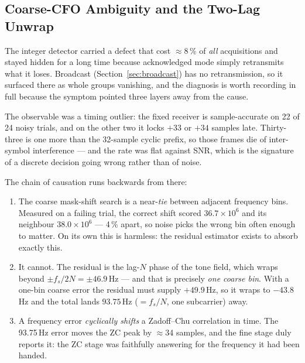 \subsection{Coarse-CFO Ambiguity and the Two-Lag Unwrap}
\label{sec:cfo_unwrap}

The integer detector carried a defect that cost $\approx$8\,\% of
\emph{all} acquisitions and stayed hidden for a long time because
acknowledged mode simply retransmits what it loses.  Broadcast
(Section~\ref{sec:broadcast}) has no retransmission, so it surfaced
there as whole groups vanishing, and the diagnosis is worth recording
in full because the symptom pointed three layers away from the cause.

The observable was a timing outlier: the fixed receiver is
sample-accurate on 22 of 24 noisy trials, and on the other two it locks
$+33$ or $+34$ samples late.  Thirty-three is one more than the
32-sample cyclic prefix, so those frames die of inter-symbol
interference --- and the rate was flat against SNR, which is the
signature of a discrete decision going wrong rather than of noise.

The chain of causation runs backwards from there:

\begin{enumerate}
    \item The coarse mask-shift search is a near-\emph{tie} between
          adjacent frequency bins.  Measured on a failing trial, the
          correct shift scored $36.7\times10^6$ and its neighbour
          $38.0\times10^6$ --- 4\,\% apart, so noise picks the wrong
          bin often enough to matter.  On its own this is harmless: the
          residual estimator exists to absorb exactly this.
    \item It cannot.  The residual is the lag-$N$ phase of the tone
          field, which wraps beyond $\pm f_s/2N = \pm 46.9$\,Hz --- and
          that is precisely \emph{one coarse bin}.  With a one-bin
          coarse error the residual must supply $+49.9$\,Hz, so it wraps
          to $-43.8$\,Hz and the total lands $93.75$\,Hz
          ($=f_s/N$, one subcarrier) away.
    \item A frequency error \emph{cyclically shifts} a Zadoff--Chu
          correlation in time.  The 93.75\,Hz error moves the ZC peak by
          $\approx$34 samples, and the fine stage duly reports it: the
          ZC stage was faithfully answering for the frequency it had
          been handed.
\end{enumerate}

